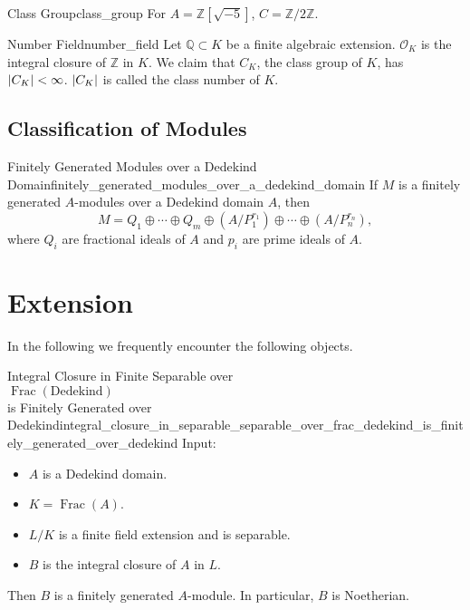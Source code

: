 \documentclass{article}
\begin{document}
\begin{example}{Class Group}{class_group}
    For $A = \mathbb{Z}[\sqrt{-5}]$, $C = \mathbb{Z}/2\mathbb{Z}$.
\end{example}

\begin{example}{Number Field}{number_field}
    Let $\mathbb{Q}\subset K$ be a finite algebraic extension.
    $\mathcal{O}_K$ is the integral closure of $\mathbb{Z}$ in $K$.
    We claim that $C_K$, the class group of $K$, has $\abs{C_K} < \infty$.
    $\abs{C_K}$ is called the class number of $K$.
\end{example}

\subsection{Classification of Modules}

\begin{theorem}{Finitely Generated Modules over a Dedekind Domain}{finitely_generated_modules_over_a_dedekind_domain}
    If $M$ is a finitely generated $A$-modules over a Dedekind domain $A$, then
    \[ M = Q_1 \oplus \cdots \oplus Q_m \oplus (A/P_1^{r_1}) \oplus \cdots \oplus (A/P_n^{r_n}), \]
    where $Q_i$ are fractional ideals of $A$ and $p_i$ are prime ideals of $A$.
\end{theorem}

\section{Extension}

In the following we frequently encounter the following objects.
\begin{center}
\end{center}

\begin{theorem}{Integral Closure in Finite Separable over\\ $\operatorname{Frac}(\text{Dedekind})$ \\is Finitely Generated over Dedekind}{integral_closure_in_separable_separable_over_frac_dedekind_is_finitely_generated_over_dedekind}
    Input:
    \begin{itemize}
        \item $A$ is a Dedekind domain.
        \item $K = \operatorname{Frac}(A)$.
        \item $L/K$ is a finite field extension and is separable.
        \item $B$ is the integral closure of $A$ in $L$.
    \end{itemize}
    Then $B$ is a finitely generated $A$-module.
    In particular, $B$ is Noetherian.
\end{theorem}
\end{document}
